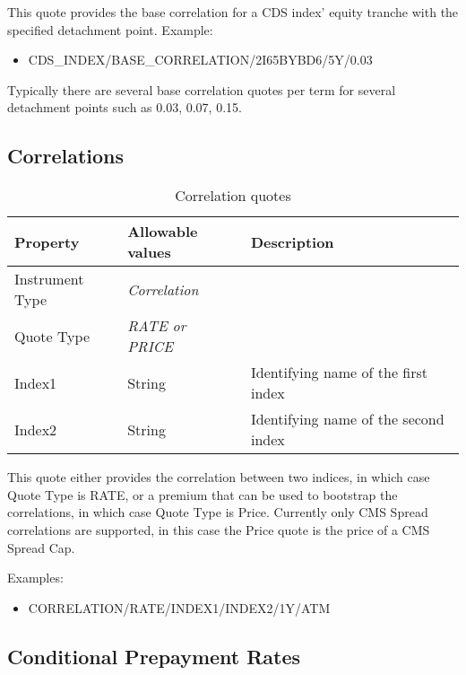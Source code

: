 This quote provides the base correlation for a CDS index' equity tranche with the specified detachment point. 
\medskip
Example:
\begin{itemize}
	\item CDS\_INDEX/BASE\_CORRELATION/2I65BYBD6/5Y/0.03
\end{itemize}

Typically there are several base correlation quotes per term for several detachment points such as 0.03, 0.07, 0.15. 

\subsection{Correlations}

\begin{table}[H]
\centering
  \begin{tabular}{|p{3cm}|p{3.5cm}|p{7cm}|}
  \hline
  {\bf Property} & {\bf Allowable values} & {\bf Description} \\ \hline
    Instrument Type & \emph{Correlation} & \\ \hline
    Quote Type & \emph{RATE or PRICE} & \\ \hline
    Index1 & String & Identifying name of the first index \\ \hline
    Index2 & String & Identifying name of the second index \\ \hline
  \end{tabular}
  \caption{Correlation quotes}
  \label{tab:correlation_quote}
\end{table}

This quote either provides the correlation between two indices, in which case Quote Type is RATE,
or a premium that can be used to bootstrap the correlations, in which case Quote Type is Price.
Currently only CMS Spread correlations are supported, in this case the Price quote is the price of a CMS Spread Cap.

\medskip
Examples:
\begin{itemize}
	\item CORRELATION/RATE/INDEX1/INDEX2/1Y/ATM
\end{itemize}

\subsection{Conditional Prepayment Rates}

